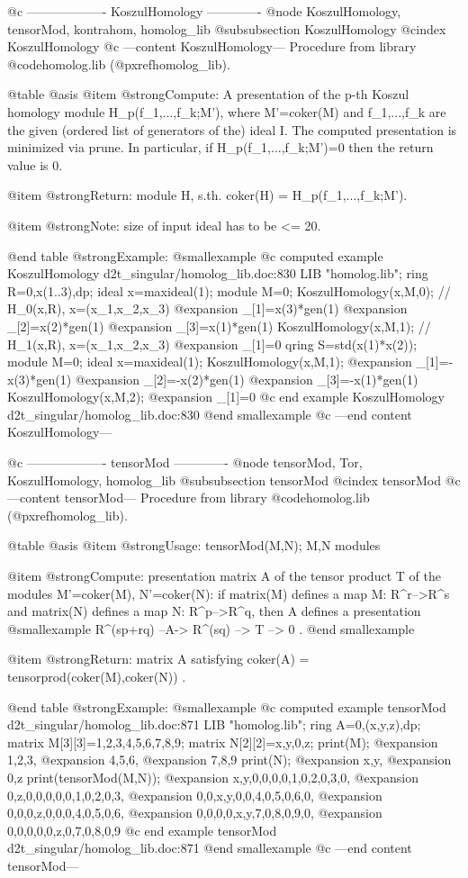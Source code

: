 @c ------------------- KoszulHomology -------------
@node KoszulHomology, tensorMod, kontrahom, homolog_lib
@subsubsection KoszulHomology
@cindex KoszulHomology
@c ---content KoszulHomology---
Procedure from library @code{homolog.lib} (@pxref{homolog_lib}).

@table @asis
@item @strong{Compute:}
A presentation of the p-th Koszul homology module H_p(f_1,...,f_k;M'),
where M'=coker(M) and f_1,...,f_k are the given (ordered list
of generators of the) ideal I. The computed presentation is minimized
via prune. In particular, if H_p(f_1,...,f_k;M')=0 then the
return value is 0.

@item @strong{Return:}
module H, s.th. coker(H) = H_p(f_1,...,f_k;M').

@item @strong{Note:}
size of input ideal has to be <= 20.

@end table
@strong{Example:}
@smallexample
@c computed example KoszulHomology d2t_singular/homolog_lib.doc:830 
LIB "homolog.lib";
ring R=0,x(1..3),dp;
ideal x=maxideal(1);
module M=0;
KoszulHomology(x,M,0);  // H_0(x,R), x=(x_1,x_2,x_3)
@expansion{} _[1]=x(3)*gen(1)
@expansion{} _[2]=x(2)*gen(1)
@expansion{} _[3]=x(1)*gen(1)
KoszulHomology(x,M,1);  // H_1(x,R), x=(x_1,x_2,x_3)
@expansion{} _[1]=0
qring S=std(x(1)*x(2));
module M=0;
ideal x=maxideal(1);
KoszulHomology(x,M,1);
@expansion{} _[1]=-x(3)*gen(1)
@expansion{} _[2]=-x(2)*gen(1)
@expansion{} _[3]=-x(1)*gen(1)
KoszulHomology(x,M,2);
@expansion{} _[1]=0
@c end example KoszulHomology d2t_singular/homolog_lib.doc:830
@end smallexample
@c ---end content KoszulHomology---

@c ------------------- tensorMod -------------
@node tensorMod, Tor, KoszulHomology, homolog_lib
@subsubsection tensorMod
@cindex tensorMod
@c ---content tensorMod---
Procedure from library @code{homolog.lib} (@pxref{homolog_lib}).

@table @asis
@item @strong{Usage:}
tensorMod(M,N); M,N modules

@item @strong{Compute:}
presentation matrix A of the tensor product T of the modules
M'=coker(M), N'=coker(N): if matrix(M) defines a map M: R^r-->R^s and
matrix(N) defines a map N: R^p-->R^q, then A defines a presentation
@smallexample
         R^(sp+rq) --A-> R^(sq)  --> T --> 0 .
@end smallexample

@item @strong{Return:}
matrix A satisfying coker(A) = tensorprod(coker(M),coker(N)) .

@end table
@strong{Example:}
@smallexample
@c computed example tensorMod d2t_singular/homolog_lib.doc:871 
LIB "homolog.lib";
ring A=0,(x,y,z),dp;
matrix M[3][3]=1,2,3,4,5,6,7,8,9;
matrix N[2][2]=x,y,0,z;
print(M);
@expansion{} 1,2,3,
@expansion{} 4,5,6,
@expansion{} 7,8,9 
print(N);
@expansion{} x,y,
@expansion{} 0,z 
print(tensorMod(M,N));
@expansion{} x,y,0,0,0,0,1,0,2,0,3,0,
@expansion{} 0,z,0,0,0,0,0,1,0,2,0,3,
@expansion{} 0,0,x,y,0,0,4,0,5,0,6,0,
@expansion{} 0,0,0,z,0,0,0,4,0,5,0,6,
@expansion{} 0,0,0,0,x,y,7,0,8,0,9,0,
@expansion{} 0,0,0,0,0,z,0,7,0,8,0,9 
@c end example tensorMod d2t_singular/homolog_lib.doc:871
@end smallexample
@c ---end content tensorMod---


